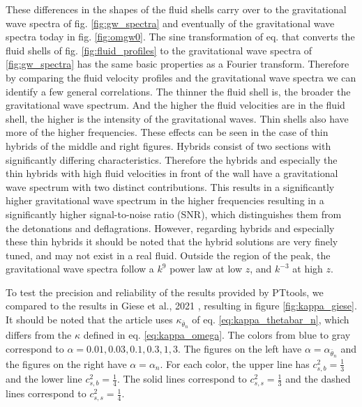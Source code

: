 These differences in the shapes of the fluid shells carry over to the gravitational wave spectra of fig. \ref{fig:gw_spectra} and eventually of the gravitational wave spectra today in fig. \ref{fig:omgw0}.
The sine transformation of eq.  that converts the fluid shells of fig. \ref{fig:fluid_profiles} to the gravitational wave spectra of \ref{fig:gw_spectra} has the same basic properties as a Fourier transform.
Therefore by comparing the fluid velocity profiles and the gravitational wave spectra we can identify a few general correlations.
The thinner the fluid shell is, the broader the gravitational wave spectrum.
And the higher the fluid velocities are in the fluid shell, the higher is the intensity of the gravitational waves.
Thin shells also have more of the higher frequencies.
These effects can be seen in the case of thin hybrids of the middle and right figures.
Hybrids consist of two sections with significantly differing characteristics.
Therefore the hybrids and especially the thin hybrids with high fluid velocities in front of the wall have a gravitational wave spectrum with two distinct contributions.
This results in a significantly higher gravitational wave spectrum in the higher frequencies resulting in a significantly higher signal-to-noise ratio (SNR),
which distinguishes them from the detonations and deflagrations.
However, regarding hybrids and especially these thin hybrids
it should be noted that the hybrid solutions are very finely tuned, and may not exist in a real fluid.
\cite[p. 5]{gowling_lisa_2021}
Outside the region of the peak, the gravitational wave spectra follow a $k^9$ power law at low $z$,
and $k^{-3}$ at high $z$.


To test the precision and reliability of the results provided by PTtools,
we compared to the results in Giese et al., 2021 \cite[fig. 2]{giese_2021},
resulting in figure \ref{fig:kappa_giese}.
It should be noted that the article uses $\kappa_{\bar{\theta}_n}$ of eq. \eqref{eq:kappa_thetabar_n},
which differs from the $\kappa$ defined in eq. \eqref{eq:kappa_omega}.
The colors from blue to gray correspond to $\alpha = 0.01, 0.03, 0.1, 0.3, 1, 3$.
The figures on the left have $\alpha = \alpha_{\bar{\theta}_n}$
and the figures on the right have $\alpha = \alpha_n$.
For each color, the upper line has $c_{s,b}^2 = \frac{1}{3}$ and the lower line $c_{s,b}^2 = \frac{1}{4}$.
The solid lines correspond to $c_{s,s}^2 = \frac{1}{3}$ and the dashed lines correspond to $c_{s,s}^2 = \frac{1}{4}$.


